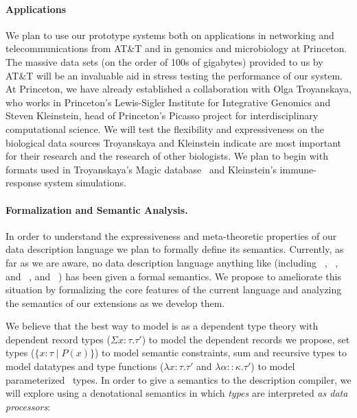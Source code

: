 \documentclass[11pt]{article}
\begin{document}
\paragraph*{Applications}
We plan to use our prototype systems both on applications
in networking and telecommunications from AT\&T and in genomics and
microbiology at Princeton.  The massive data sets (on the order of
100s of gigabytes) provided to us by AT\&T will be an
invaluable aid in stress testing the performance of our system.
At Princeton, we have already established
a collaboration with Olga Troyanskaya, who works in Princeton's 
Lewis-Sigler Institute 
for Integrative Genomics and Steven Kleinstein, head of
Princeton's Picasso project for interdisciplinary 
computational science.  We will test the flexibility
and expressiveness on the biological data sources
Troyanskaya and Kleinstein indicate are most important
for their research and the research of other biologists.
We plan to begin with formats used in Troyanskaya's Magic 
database~\cite{magic} and Kleinstein's immune-response system 
simulations.

\paragraph*{Formalization and Semantic Analysis.}
In order to understand the expressiveness and meta-theoretic
properties of our data description language
we plan to formally define its semantics.
Currently, as far as we are aware, no data description language
anything like \datatype{}
(including \pads~\cite{pads}, \packettypes~\cite{packettypes}, and \datascript~\cite{datascript}, and \blt~\cite{blt})
has been given a formal semantics.  
We propose to ameliorate this situation by
formalizing the core features of the current language
and analyzing the semantics of our extensions as we develop them.

We believe that the best way to model \datatype{} is as a dependent
type theory with dependent record types ($\Sigma x{:}\tau.\tau'$) to model
the dependent records we propose, set types 
($\{x{:}\tau \; | \; P(x) \}$) to model
semantic constraints, sum and recursive types to model
datatypes and type functions
($\lambda x{:}\tau.\tau'$ and $\lambda \alpha{::}\kappa.\tau'$) 
to model parameterized \pads{}\ types.  
In order to give a semantics to the \datatype{} description
compiler, we will explore using
a denotational semantics in which {\em types} are interpreted 
{\em as data processors}:
\end{document}
